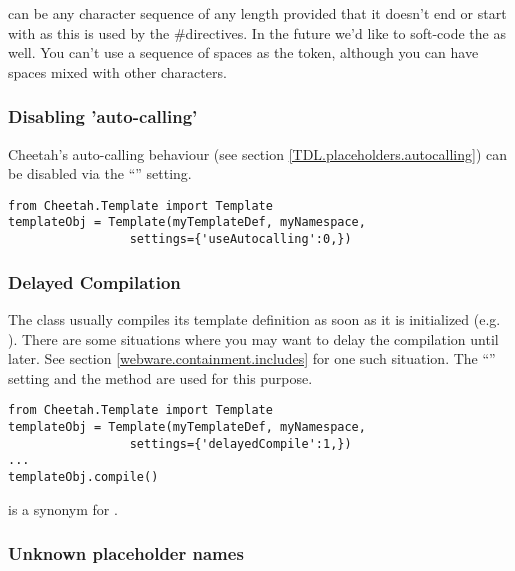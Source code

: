  can be any character sequence of any length
provided that it doesn't end or start with \code{\#} as this is used by the
\#directives.  In the future we'd like to soft-code the
 as well.  You can't use a sequence of spaces as
the token, although you can have spaces mixed with other characters.


\subsubsection{Disabling 'auto-calling'}

Cheetah's auto-calling behaviour (see section
\ref{TDL.placeholders.autocalling}) can be disabled via the
``'' setting.

\begin{verbatim}
from Cheetah.Template import Template
templateObj = Template(myTemplateDef, myNamespace, 
                 settings={'useAutocalling':0,})
\end{verbatim}



\subsubsection{Delayed Compilation}

The  class usually compiles its template
definition as soon as it is initialized (e.g. ).
There are some situations where you may want to delay the compilation until
later. See section \ref{webware.containment.includes} for one such situation.
The ``'' setting and the  method
are used for this purpose.

\begin{verbatim}
from Cheetah.Template import Template
templateObj = Template(myTemplateDef, myNamespace, 
                 settings={'delayedCompile':1,})
...
templateObj.compile()
\end{verbatim}

 is a synonym for .

\subsubsection{Unknown placeholder names}

